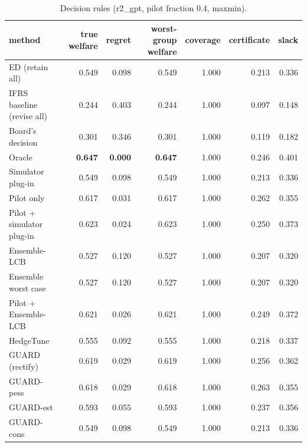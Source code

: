 \begin{table}[t]
\centering
\small
\begin{tabular}{lrrrrrr}
\toprule
method & true welfare & regret & worst-group welfare & coverage & certificate & slack \\
\midrule
ED (retain all) & 0.549 & 0.098 & 0.549 & 1.000 & 0.213 & 0.336 \\
IFRS baseline (revise all) & 0.244 & 0.403 & 0.244 & 1.000 & 0.097 & 0.148 \\
Board's decision & 0.301 & 0.346 & 0.301 & 1.000 & 0.119 & 0.182 \\
Oracle & \textbf{0.647} & \textbf{0.000} & \textbf{0.647} & 1.000 & 0.246 & 0.401 \\
Simulator plug-in & 0.549 & 0.098 & 0.549 & 1.000 & 0.213 & 0.336 \\
Pilot only & 0.617 & 0.031 & 0.617 & 1.000 & 0.262 & 0.355 \\
Pilot + simulator plug-in & 0.623 & 0.024 & 0.623 & 1.000 & 0.250 & 0.373 \\
Ensemble-LCB & 0.527 & 0.120 & 0.527 & 1.000 & 0.207 & 0.320 \\
Ensemble worst case & 0.527 & 0.120 & 0.527 & 1.000 & 0.207 & 0.320 \\
Pilot + Ensemble-LCB & 0.621 & 0.026 & 0.621 & 1.000 & 0.249 & 0.372 \\
HedgeTune & 0.555 & 0.092 & 0.555 & 1.000 & 0.218 & 0.337 \\
GUARD (rectify) & 0.619 & 0.029 & 0.619 & 1.000 & 0.256 & 0.362 \\
GUARD-pess & 0.618 & 0.029 & 0.618 & 1.000 & 0.263 & 0.355 \\
GUARD-est & 0.593 & 0.055 & 0.593 & 1.000 & 0.237 & 0.356 \\
GUARD-cons & 0.549 & 0.098 & 0.549 & 1.000 & 0.213 & 0.336 \\
\bottomrule
\end{tabular}
\caption{Decision rules (r2\_gpt, pilot fraction 0.4, maxmin).}
\label{tab:methods-maxmin}
\end{table}
